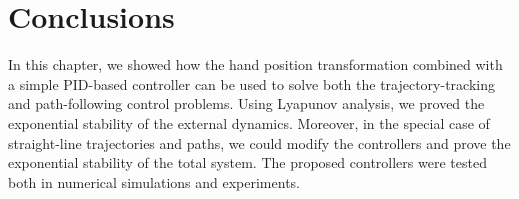 \section{Conclusions}
\label{sec:handpos_trajectory_conclusions}
In this chapter, we showed how the hand position transformation combined with a simple PID-based controller can be used to solve both the trajectory-tracking and path-following control problems.
Using Lyapunov analysis, we proved the exponential stability of the external dynamics.
Moreover, in the special case of straight-line trajectories and paths, we could modify the controllers and prove the exponential stability of the total system.
The proposed controllers were tested both in numerical simulations and experiments.
